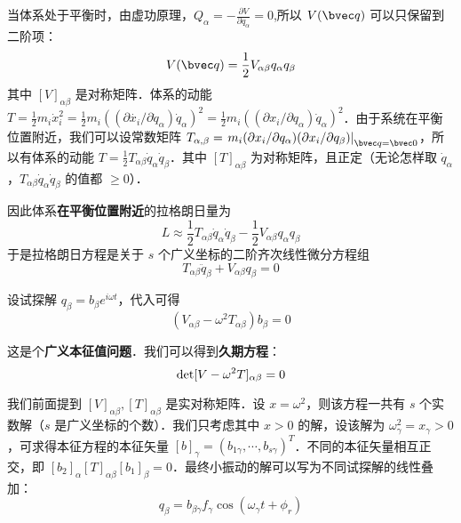 当体系处于平衡时，由虚功原理，$Q_\alpha=-\frac{\partial V}{\partial q_\alpha}=0$,所以 $V(\bvec q)$ 可以只保留到二阶项：
\begin{equation}
V(\bvec q)=\frac{1}{2}V_{\alpha\beta}q_\alpha q_\beta
\end{equation}
其中 $[V]_{\alpha\beta}$ 是对称矩阵．体系的动能 $T=\frac{1}{2}m_i\dot{x}_i^2=\frac{1}{2}m_i((\partial \dot{x_i} / \partial \dot{q}_\alpha) \dot{q}_\alpha)^2= \frac{1}{2}m_i((\partial x_i/\partial q_\alpha)\dot{q}_\alpha)^2$．由于系统在平衡位置附近，我们可以设常数矩阵 $T_{\alpha,\beta}=\left.m_i(\partial x_i/\partial q_\alpha)(\partial x_i/\partial q_\beta)\right|_{\bvec q=\bvec 0}$，所以有体系的动能 $T=\frac{1}{2}T_{\alpha\beta} \dot{q}_\alpha \dot{q}_\beta$．其中 $[T]_{\alpha\beta}$ 为对称矩阵，且正定（无论怎样取 $\dot{q}_\alpha$，$T_{\alpha\beta} \dot{q}_\alpha \dot{q}_\beta$ 的值都 $\ge0$）．

因此体系\textbf{在平衡位置附近}的拉格朗日量为
\begin{equation}
L\approx\frac{1}{2}T_{\alpha\beta}\dot{q}_\alpha \dot{q}_\beta-\frac{1}{2}V_{\alpha\beta}q_\alpha q_\beta
\end{equation}
于是拉格朗日方程是关于 $s$ 个广义坐标的二阶齐次线性微分方程组
\begin{equation}
T_{\alpha\beta}\ddot{q}_\beta+V_{\alpha\beta}q_\beta=0
\end{equation}

设试探解 $q_\beta=b_\beta e^{i\omega t}$，代入可得
\begin{equation}
(V_{\alpha\beta} - \omega^2 T_{\alpha\beta}) b_\beta = 0
\end{equation}

这是个\textbf{广义本征值问题}．我们可以得到\textbf{久期方程}：
\begin{equation}
{\rm{det}}[V-\omega^2 T]_{\alpha\beta}=0 
\end{equation}

我们前面提到 $[V]_{\alpha\beta},[T]_{\alpha\beta}$ 是实对称矩阵．设 $x=\omega^2$，则该方程一共有 $s$ 个实数解（$s$ 是广义坐标的个数）．我们只考虑其中 $x>0$ 的解，设该解为 $\omega_\gamma^2=x_\gamma>0$，可求得本征方程的本征矢量 $[b]_\gamma=(b_{1\gamma},\cdots,b_{s\gamma})^T$．不同的本征矢量相互正交，即 $[b_2]_{\alpha} [T]_{\alpha\beta} [b_1]_{\beta}=0$．最终小振动的解可以写为不同试探解的线性叠加：
\begin{equation}
q_\beta = b_{\beta\gamma}f_\gamma \cos(\omega_\gamma t + \phi_r)
\end{equation}